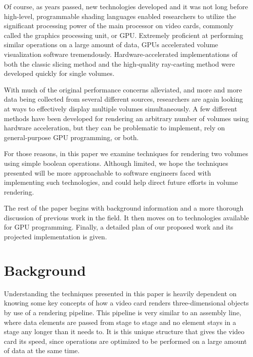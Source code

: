 \documentclass{report}
\begin{document}
Of course, as years passed, new technologies developed and it was not long
before high-level, programmable shading languages enabled researchers to utilize
the significant processing power of the main processor on video cards, commonly
called the graphics processing unit, or GPU.  Extremely proficient at performing
similar operations on a large amount of data, GPUs accelerated volume
visualization software tremendously.  Hardware-accelerated implementations of
both the classic slicing method and the high-quality ray-casting method were
developed quickly for single volumes.

With much of the original performance concerns alleviated, and more and more
data being collected from several different sources, researchers are again
looking at ways to effectively display multiple volumes simultaneously.  A few
different methods have been developed for rendering an arbitrary number of
volumes using hardware acceleration, but they can be problematic to implement,
rely on general-purpose GPU programming, or both.

For those reasons, in this paper we examine techniques for rendering two volumes
using simple boolean operations.  Although limited, we hope the techniques
presented will be more approachable to software engineers faced with
implementing such technologies, and could help direct future efforts in volume
rendering.

The rest of the paper begins with background information and a more thorough
discussion of previous work in the field.  It then moves on to technologies
available for GPU programming.  Finally, a detailed plan of our proposed work
and its projected implementation is given.

\chapter{Background}

Understanding the techniques presented in this paper is heavily dependent on
knowing some key concepts of how a video card renders three-dimensional objects
by use of a rendering pipeline.  This pipeline is very similar to an assembly
line, where data elements are passed from stage to stage and no element stays in
a stage any longer than it needs to.  It is this unique structure that gives the
video card its speed, since operations are optimized to be performed on a large
amount of data at the same time.
\end{document}
